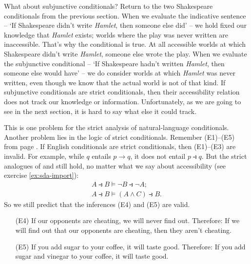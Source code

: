 What about subjunctive conditionals? Return to the two Shakespeare conditionals
from the previous section. When we evaluate the indicative sentence -- `If
Shakespeare didn't write \emph{Hamlet}, then someone else did' -- we hold fixed
our knowledge that \emph{Hamlet} exists; worlds where the play was never written
are inaccessible. That's why the conditional is true. At all accessible worlds
at which Shakespeare didn't write \emph{Hamlet}, someone else wrote the play.
When we evaluate the subjunctive conditional -- `If Shakespeare hadn't written
\emph{Hamlet}, then someone else would have' -- we do consider worlds at which
\emph{Hamlet} was never written, even though we know that the actual world is
not of that kind. If subjunctive conditionals are strict conditionals, then
their accessibility relation does not track our knowledge or information.
Unfortunately, as we are going to see in the next section, it is hard to say
what else it could track.

This is one problem for the strict analysis of natural-language conditionals.
Another problem lies in the logic of strict conditionals. Remember (E1)--(E5)
from page \pageref{paradoxes-mat-imp}. If English conditionals are strict
conditionals, then (E1)--(E3) are invalid. For example, while $q$ entails
$p \to q$, it does not entail $p \strictif q$. But the strict analogues of
 and  still hold, no matter what we say about accessibility (see
exercise \ref{ex:sda-import}):
\begin{gather*}
  A \strictif B \models \neg B\strictif \neg A;\\
  A \strictif B \models (A\land C) \strictif  B.
\end{gather*}
So we still predict that the inferences (E4) and (E5) are valid.

\begin{enumerate}[leftmargin=12mm]
  \itemsep1mm
  \item[(E4)] If our opponents are cheating, we will never find out. Therefore:
        If we will find out that our opponents are cheating, then they aren't
        cheating.
  \item[(E5)] If you add sugar to your coffee, it will taste good. Therefore: If
        you add sugar and vinegar to your coffee, it will taste good.
\end{enumerate}

